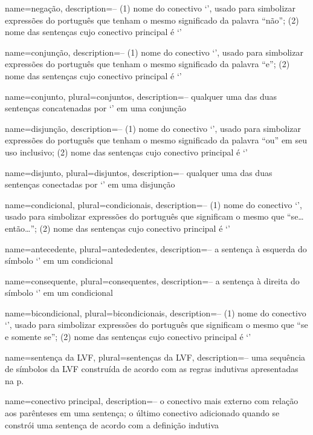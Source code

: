 {
 name=negação,
 description={-- (1) nome do conectivo `\enot', usado para simbolizar expressões do português que tenham o mesmo significado da palavra ``não''; (2) nome das sentenças cujo conectivo principal é `\enot'}
}

{
 name=conjunção,
 description={-- (1) nome do conectivo `\eand', usado para simbolizar expressões do português que tenham o mesmo significado da palavra ``e''; (2) nome das sentenças cujo conectivo principal é `\eand'}
}

{
 name=conjunto,
 plural=conjuntos,
 description={-- qualquer uma das duas sentenças concatenadas por `\eand' em uma conjunção}
}

{
 name=disjunção,
 description={-- (1) nome do conectivo `\eor', usado para simbolizar expressões do português que tenham o mesmo significado da palavra ``ou'' em seu uso inclusivo; (2) nome das sentenças cujo conectivo principal é `\eor'}
}

{
 name=disjunto,
 plural=disjuntos,
 description={-- qualquer uma das duas sentenças conectadas por `\eor' em uma disjunção}
}

{
 name=condicional,
 plural=condicionais,
 description={-- (1) nome do conectivo `\eif', usado para simbolizar expressões do português que significam o mesmo que ``se\ldots{}então\ldots''; (2) nome das sentenças cujo conectivo principal é `\eif'}
}

{
 name=antecedente,
 plural=antededentes,
 description={-- a sentença à esquerda do símbolo `\eif' em um condicional}
}

{
 name=consequente,
 plural=consequentes,
 description={-- a sentença à direita do símbolo `\eif' em um condicional}
}

{
 name=bicondicional,
 plural=bicondicionais,
 description={-- (1) nome do conectivo `\eiff', usado para simbolizar expressões do português que significam o mesmo que ``se e somente se''; (2) nome das sentenças cujo conectivo principal é `\eiff'}
}

{
 name=sentença da LVF,
 plural=sentenças da LVF,
 description={-- uma sequência de símbolos da LVF construída de acordo com as regras indutivas apresentadas na p.~\pageref{TFLsentences}}
}

{
 name=conectivo principal,
 description={-- o conectivo mais externo com relação aos parênteses em uma sentença; o último conectivo adicionado quando se constrói uma sentença de acordo com a definição indutiva}
}


